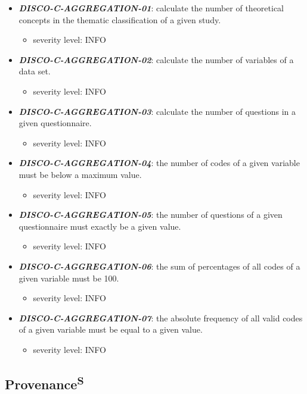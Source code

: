 \documentclass{llncs}
\begin{document}
\begin{itemize}
	\item \textbf{{\em DISCO-C-AGGREGATION-01}}: calculate the number of theoretical concepts in the thematic classification of a given study.
	\begin{itemize}
		\item severity level: INFO
	\end{itemize}
  \item \textbf{{\em DISCO-C-AGGREGATION-02}}: calculate the number of variables of a data set.
	\begin{itemize}
		\item severity level: INFO
	\end{itemize}
	\item \textbf{{\em DISCO-C-AGGREGATION-03}}: calculate the number of questions in a given questionnaire.
	\begin{itemize}
		\item severity level: INFO
	\end{itemize}
	\item \textbf{{\em DISCO-C-AGGREGATION-04}}: the number of codes of a given variable must be below a maximum value.
	\begin{itemize}
		\item severity level: INFO
	\end{itemize}
	\item \textbf{{\em DISCO-C-AGGREGATION-05}}: the number of questions of a given questionnaire must exactly be a given value.
	\begin{itemize}
		\item severity level: INFO
	\end{itemize}
	\item \textbf{{\em DISCO-C-AGGREGATION-06}}: the sum of percentages of all codes of a given variable must be 100.
	\begin{itemize}
		\item severity level: INFO
	\end{itemize}
  \item \textbf{{\em DISCO-C-AGGREGATION-07}}: the absolute frequency of all valid codes of a given variable must be equal to a given value.
	\begin{itemize}
		\item severity level: INFO
	\end{itemize}
\end{itemize} 

\subsection{Provenance\textsuperscript{S}}
\end{document}
